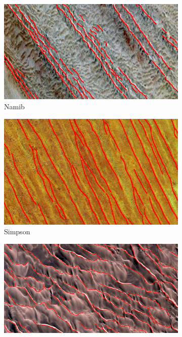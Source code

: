 \begin{figure}[htbp]
\begin{subfigure}[b]{0.3\textwidth}
		\label{fig:kalahari_image}
	\end{subfigure}
	\begin{subfigure}[b]{0.3\textwidth}
		\centering	
		\includegraphics[width=\textwidth]{figures/namib_with_gt}
		\caption{ Namib }
		\label{fig:namib_image}
	\end{subfigure}
	\begin{subfigure}[b]{0.3\textwidth}
		\centering
		\includegraphics[width=\textwidth]{figures/simpson_with_gt}
		\caption{ Simpson }
		\label{fig:simpson_image}
	\end{subfigure}
	\begin{subfigure}[b]{0.3\textwidth}
		\centering
		\includegraphics[width=\textwidth]{figures/skeleton_coast_with_gt}

\end{subfigure}
\end{figure}
